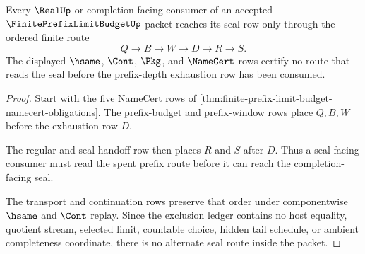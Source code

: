 \begin{theorem}
\label{thm:finite-prefix-limit-budget-seal-ordering}
Every $\RealUp$ or completion-facing consumer of an accepted $\FinitePrefixLimitBudgetUp$ packet reaches its seal row only through the ordered finite route
$$
Q \to B \to W \to D \to R \to S.
$$
The displayed $\hsame$, $\Cont$, $\Pkg$, and $\NameCert$ rows certify no route that reads the seal before the prefix-depth exhaustion row has been consumed.
\end{theorem}
\begin{proof}
Start with the five NameCert rows of \autoref{thm:finite-prefix-limit-budget-namecert-obligations}. The prefix-budget and prefix-window rows place $Q,B,W$ before the exhaustion row $D$.

The regular and seal handoff row then places $R$ and $S$ after $D$. Thus a seal-facing consumer must read the spent prefix route before it can reach the completion-facing seal.

The transport and continuation rows preserve that order under componentwise $\hsame$ and $\Cont$ replay. Since the exclusion ledger contains no host equality, quotient stream, selected limit, countable choice, hidden tail schedule, or ambient completeness coordinate, there is no alternate seal route inside the packet.
\end{proof}

